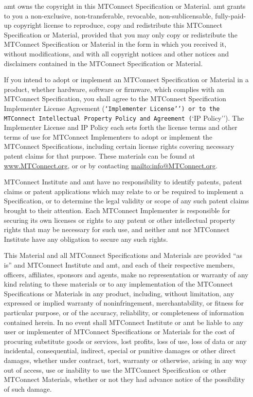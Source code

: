 \gls{amt} owns the copyright in this MTConnect Specification or Material. \gls{amt} grants to you a non-exclusive, non-transferable, revocable, non-sublicensable, fully-paid-up copyright license to reproduce, copy and redistribute this MTConnect Specification or Material, provided that you may only copy or redistribute the MTConnect Specification or Material in the form in which you received it, without modifications, and with all copyright notices and other notices and disclaimers contained in the MTConnect Specification or Material.

If you intend to adopt or implement an MTConnect Specification or Material in a product, whether hardware, software or firmware, which complies with an MTConnect Specification, you shall agree to the MTConnect Specification Implementer License Agreement (\texttt{`Implementer License'') or to the MTConnect Intellectual Property Policy and Agreement (}`IP Policy''). The Implementer License and IP Policy each sets forth the license terms and other terms of use for MTConnect Implementers to adopt or implement the MTConnect Specifications, including certain license rights covering necessary patent claims for that purpose. These materials can be found at \url{www.MTConnect.org}, or or by contacting \url{mailto:info@MTConnect.org}. 

MTConnect Institute and \gls{amt} have no responsibility to identify patents, patent claims or patent applications which may relate to or be required to implement a Specification, or to determine the legal validity or scope of any such patent claims brought to their attention. Each MTConnect Implementer is responsible for securing its own licenses or rights to any patent or other intellectual property rights that may be necessary for such use, and neither \gls{amt} nor MTConnect Institute have any obligation to secure any such rights.

This Material and all MTConnect Specifications and Materials are provided ``as is'' and MTConnect Institute and \gls{amt}, and each of their respective members, officers, affiliates, sponsors and agents, make no representation or warranty of any kind relating to these materials or to any implementation of the MTConnect Specifications or Materials in any product, including, without limitation, any expressed or implied warranty of noninfringement, merchantability, or fitness for particular purpose, or of the accuracy, reliability, or completeness of information contained herein. In no event shall MTConnect Institute or \gls{amt} be liable to any user or implementer of MTConnect Specifications or Materials for the cost of procuring substitute goods or services, lost profits, loss of use, loss of data or any incidental, consequential, indirect, special or punitive damages or other direct damages, whether under contract, tort, warranty or otherwise, arising in any way out of access, use or inability to use the MTConnect Specification or other MTConnect Materials, whether or not they had advance notice of the possibility of such damage.

